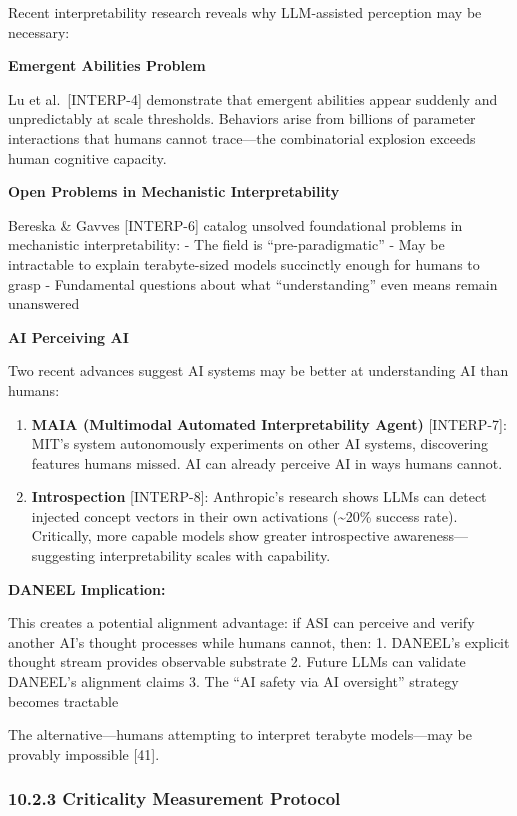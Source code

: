 \documentclass[
]{article}
\begin{document}
Recent interpretability research reveals why LLM-assisted perception may
be necessary:

\textbf{Emergent Abilities Problem}

Lu et al.~{[}INTERP-4{]} demonstrate that emergent abilities appear
suddenly and unpredictably at scale thresholds. Behaviors arise from
billions of parameter interactions that humans cannot trace---the
combinatorial explosion exceeds human cognitive capacity.

\textbf{Open Problems in Mechanistic Interpretability}

Bereska \& Gavves {[}INTERP-6{]} catalog unsolved foundational problems
in mechanistic interpretability: - The field is ``pre-paradigmatic'' -
May be intractable to explain terabyte-sized models succinctly enough
for humans to grasp - Fundamental questions about what ``understanding''
even means remain unanswered

\textbf{AI Perceiving AI}

Two recent advances suggest AI systems may be better at understanding AI
than humans:

\begin{enumerate}
\def\labelenumi{\arabic{enumi}.}
\item
  \textbf{MAIA (Multimodal Automated Interpretability Agent)}
  {[}INTERP-7{]}: MIT's system autonomously experiments on other AI
  systems, discovering features humans missed. AI can already perceive
  AI in ways humans cannot.
\item
  \textbf{Introspection} {[}INTERP-8{]}: Anthropic's research shows LLMs
  can detect injected concept vectors in their own activations
  (\textasciitilde20\% success rate). Critically, more capable models
  show greater introspective awareness---suggesting interpretability
  scales with capability.
\end{enumerate}

\textbf{DANEEL Implication:}

This creates a potential alignment advantage: if ASI can perceive and
verify another AI's thought processes while humans cannot, then: 1.
DANEEL's explicit thought stream provides observable substrate 2. Future
LLMs can validate DANEEL's alignment claims 3. The ``AI safety via AI
oversight'' strategy becomes tractable

The alternative---humans attempting to interpret terabyte models---may
be provably impossible {[}41{]}.

\hypertarget{criticality-measurement-protocol}{%
\subsubsection{10.2.3 Criticality Measurement
Protocol}\label{criticality-measurement-protocol}}
\end{document}
